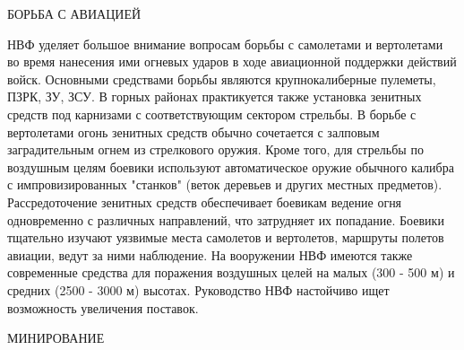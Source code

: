 \documentclass[12pt,a4paper]{report}
\begin{document}
БОРЬБА С АВИАЦИЕЙ 

НВФ уделяет большое внимание вопросам борьбы с самолетами и вертолетами во время нанесения ими огневых ударов в ходе авиационной поддержки действий войск. Основными средствами борьбы являются крупнокалиберные пулеметы, ПЗРК, ЗУ, ЗСУ. В горных районах практикуется также установка зенитных средств под карнизами с соответствующим сектором стрельбы. В борьбе с вертолетами огонь зенитных средств обычно сочетается с залповым заградительным огнем из стрелкового оружия. Кроме того, для стрельбы по воздушным целям боевики используют автоматическое оружие обычного калибра с импровизированных "станков" (веток деревьев и других местных предметов). Рассредоточение зенитных средств обеспечивает боевикам ведение огня одновременно с различных направлений, что затрудняет их попадание. Боевики тщательно изучают уязвимые места самолетов и вертолетов, маршруты полетов авиации, ведут за ними наблюдение. На вооружении НВФ имеются также современные средства для поражения воздушных целей на малых (300 - 500 м) и средних (2500 - 3000 м) высотах. Руководство НВФ настойчиво ищет возможность увеличения поставок. 

МИНИРОВАНИЕ 
\end{document}
